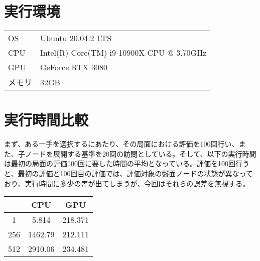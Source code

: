 \documentclass{jsarticle}
\title{}
\author{4年15組28番 高野昂平}
\date{}
\begin{document}
\maketitle
\section{実行環境}
\begin{table}[h]
    \begin{center}
        \begin{tabular}{ll}
            OS & Ubuntu 20.04.2 LTS \\
            CPU & Intel(R) Core(TM) i9-10900X CPU @ 3.70GHz \\
            GPU & GeForce RTX 3080 \\
            メモリ & 32GB \\
        \end{tabular}
    \end{center}
\end{table}
\section{実行時間比較}
まず、ある一手を選択するにあたり、その局面における評価を100回行い、また、子ノードを展開する基準を20回の訪問としている。そして、以下の実行時間は最初の局面の評価100回に要した時間の平均となっている。評価を100回行うと、最初の評価と100回目の評価では、評価対象の盤面ノードの状態が異なっており、実行時間に多少の差が出てしまうが、今回はそれらの誤差を無視する。
\begin{table}[h]
    \begin{center}
        \begin{tabular}{c|c|c}
            & CPU & GPU \\ \hline
        1 & 5.814 & 218.371 \\ \hline
        256 & 1462.79 & 212.111 \\ \hline
        512 & 2910.06 & 234.481 \\ 
        \end{tabular}
    \end{center}
\end{table}
\end{document}
